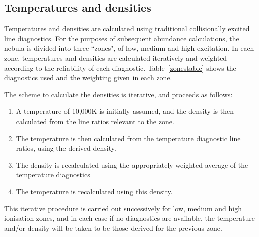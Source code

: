 \documentclass[useAMS,usenatbib]{mn2e}
\begin{document}
\subsection{Temperatures and densities}

Temperatures and densities are calculated using traditional collisionally excited line diagnostics.  For the purposes of subsequent abundance calculations, the nebula is divided into three ``zones", of low, medium and high excitation.  In each zone, temperatures and densities are calculated iteratively and weighted according to the reliability of each diagnostic.  Table~\ref{zonestable} shows the diagnostics used and the weighting given in each zone.

The scheme to calculate the densities is iterative, and proceeds as follows:

\begin{enumerate}
\item A temperature of 10,000K is initially assumed, and the density is then calculated from the line ratios relevant to the zone.
\item The temperature is then calculated from the temperature diagnostic line ratios, using the derived density.
\item The density is recalculated using the appropriately weighted average of the temperature diagnostics
\item The temperature is recalculated using this density.
\end{enumerate}

This iterative procedure is carried out successively for low, medium and high ionisation zones, and in each case if no diagnostics are available, the temperature and/or density will be taken to be those derived for the previous zone.
\end{document}
